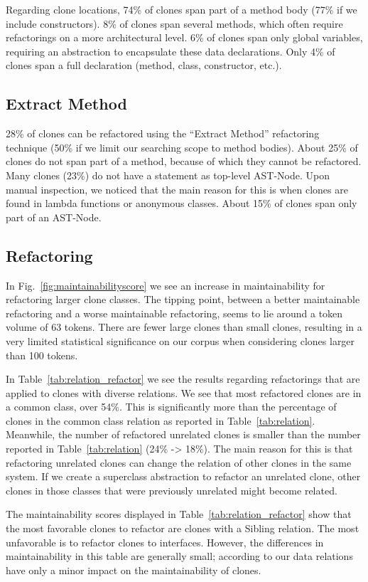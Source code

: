 \documentclass[sigconf,review, table]{acmart}
\begin{document}
Regarding clone locations, 74\% of clones span part of a method body (77\% if we include constructors). 8\% of clones span several methods, which often require refactorings on a more architectural level. 6\% of clones span only global variables, requiring an abstraction to encapsulate these data declarations. Only 4\% of clones span a full declaration (method, class, constructor, etc.).

\subsection{Extract Method}
28\% of clones can be refactored using the ``Extract Method'' refactoring technique (50\% if we limit our searching scope to method bodies). About 25\% of clones do not span part of a method, because of which they cannot be refactored. Many clones (23\%) do not have a statement as top-level AST-Node. Upon manual inspection, we noticed that the main reason for this is when clones are found in lambda functions or anonymous classes. About 15\% of clones span only part of an AST-Node.

\subsection{Refactoring}
In Fig.~\ref{fig:maintainabilityscore} we see an increase in maintainability for refactoring larger clone classes. The tipping point, between a better maintainable refactoring and a worse maintainable refactoring, seems to lie around a token volume of 63 tokens. There are fewer large clones than small clones, resulting in a very limited statistical significance on our corpus when considering clones larger than 100 tokens.

In Table~\ref{tab:relation_refactor} we see the results regarding refactorings that are applied to clones with diverse relations. We see that most refactored clones are in a common class, over 54\%. This is significantly more than the percentage of clones in the common class relation as reported in Table~\ref{tab:relation}. Meanwhile, the number of refactored unrelated clones is smaller than the number reported in Table~\ref{tab:relation} (24\% -> 18\%). The main reason for this is that refactoring unrelated clones can change the relation of other clones in the same system. If we create a superclass abstraction to refactor an unrelated clone, other clones in those classes that were previously unrelated might become related.

The maintainability scores displayed in Table~\ref{tab:relation_refactor} show that the most favorable clones to refactor are clones with a Sibling relation. The most unfavorable is to refactor clones to interfaces. However, the differences in maintainability in this table are generally small; according to our data relations have only a minor impact on the maintainability of clones.
\end{document}
